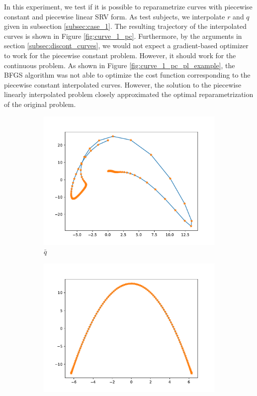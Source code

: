 In this experiment, we test if it is possible to reparametrize curves with piecewise constant and piecewise linear SRV form. As test subjects, we interpolate \(r\) and \(q\) given in subsection \ref{subsec:case_1}. The resulting trajectory of the interpolated curves is shown in Figure \ref{fig:curve_1_pc}. Furthermore, by the arguments in section \ref{subsec:discont_curves}, we would not expect a gradient-based optimizer to work for the piecewise constant problem. However, it should work for the continuous problem. As shown in Figure \ref{fig:curve_1_pc_pl_example}, the BFGS algorithm was not able to optimize the cost function corresponding to the piecewise constant interpolated curves. However, the solution to the piecewise linearly interpolated problem closely approximated the optimal reparametrization of the original problem. 
\begin{figure}[b]
    \begin{subfigure}[t]{0.5\textwidth}
        \centering
        \includegraphics[width=\linewidth]{figures/curve_1_pc/curve_q_pc.pdf}
        \caption{\(\bar q\)}\label{fig:curve_1_pc_q}
    \end{subfigure}
    \begin{subfigure}[t]{0.5\textwidth}
        \centering
        \includegraphics[width=\linewidth]{figures/curve_1_pc/curve_r_pc.pdf}

\end{subfigure}
\end{figure}
